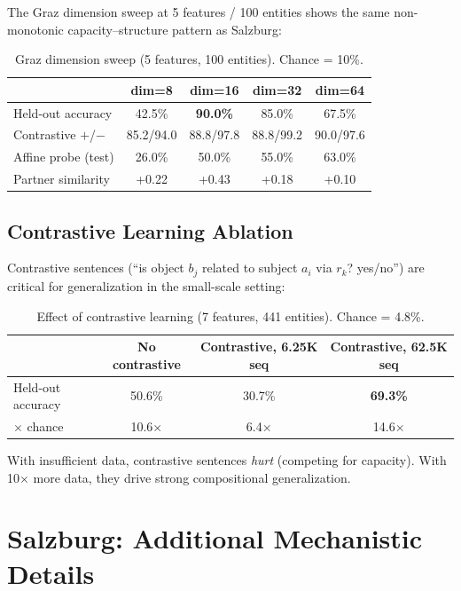 \documentclass[11pt]{article}
\begin{document}
The Graz dimension sweep at 5 features / 100 entities shows the same
non-monotonic capacity--structure pattern as Salzburg:

\begin{table}[h]
\centering
\caption{Graz dimension sweep (5 features, 100 entities). Chance = 10\%.}
\begin{tabular}{lcccc}
\toprule
& dim=8 & dim=16 & dim=32 & dim=64 \\
\midrule
Held-out accuracy & 42.5\% & \textbf{90.0\%} & 85.0\% & 67.5\% \\
Contrastive $+$/$-$ & 85.2/94.0 & 88.8/97.8 & 88.8/99.2 & 90.0/97.6 \\
Affine probe (test) & 26.0\% & 50.0\% & 55.0\% & 63.0\% \\
Partner similarity & +0.22 & +0.43 & +0.18 & +0.10 \\
\bottomrule
\end{tabular}
\end{table}

\subsection{Contrastive Learning Ablation}

Contrastive sentences (``is object $b_j$ related to subject $a_i$ via $r_k$?  yes/no'')
are critical for generalization in the small-scale setting:

\begin{table}[h]
\centering
\caption{Effect of contrastive learning (7 features, 441 entities). Chance = 4.8\%.}
\begin{tabular}{lccc}
\toprule
& No contrastive & Contrastive, 6.25K seq & Contrastive, 62.5K seq \\
\midrule
Held-out accuracy & 50.6\% & 30.7\% & \textbf{69.3\%} \\
$\times$ chance & 10.6$\times$ & 6.4$\times$ & 14.6$\times$ \\
\bottomrule
\end{tabular}
\end{table}

With insufficient data, contrastive sentences \emph{hurt} (competing for capacity).
With 10$\times$ more data, they drive strong compositional generalization.

\section{Salzburg: Additional Mechanistic Details}
\label{app:salzburg}
\end{document}
